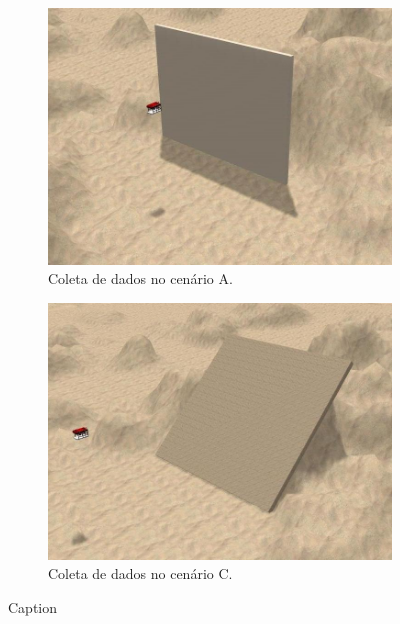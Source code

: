 \begin{figure}[H]
    \centering
    \begin{subfigure}[t]{0.48\textwidth}
        \includegraphics[width=\textwidth]{dados/figuras/projection_wall3.jpg}
        \caption{Coleta de dados no cenário A.}
        \label{fig:projection_wall3}
    \end{subfigure}
    \begin{subfigure}[t]{0.48\textwidth}
        \includegraphics[width=\textwidth]{dados/figuras/projection_declined.jpg}
        \caption{Coleta de dados no cenário C.}
        \label{fig:projection_declined}
    \end{subfigure}
    \caption{Caption}
    \label{fig:my_label}
\end{figure}

